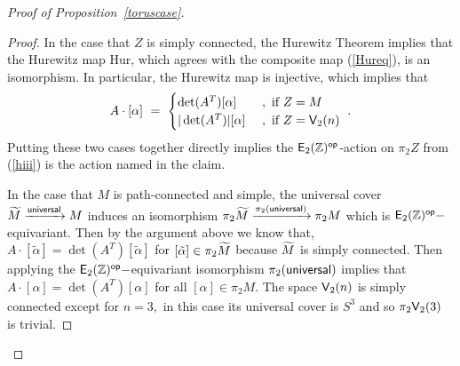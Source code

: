 \begin{proof}[Proof of Proposition~\ref{toruscase}]
\begin{proof}


In the case that $Z$ is simply connected, the Hurewitz Theorem implies that the Hurewitz map {\sf Hur}, which agrees with the composite map (\ref{Hureq}), is an isomorphism.
In particular, the Hurewitz map is injective, which implies that 
\[
A \cdot [\alpha]
~=~ 
\begin{cases}
\det(A^T)[\alpha]
&
~,
\text{ if }Z=M
\\
| \det(A^T)| [\alpha] 
&
~,
\text{ if }Z=\mathsf V_2(n)
\end{cases}
~.
\]
Putting these two cases together directly implies the ${\sf E}_2(\mathbb Z)^{\operatorname{\mathsf{op}}}$-action on $\pi_{2}Z$ from (\ref{hiii}) is the action named in the claim.  


In the case that $M$ is path-connected and simple, the universal cover $\widetilde{M} \xrightarrow{\sf universal} M$ induces an isomorphism $\pi_{2}\widetilde{M} \xrightarrow{\pi_{2}(\sf universal)} \pi_{2}M$ which is $\mathsf E_2(\mathbb Z)^{\operatorname{\mathsf{op}}}-$equivariant. Then by the argument above we know that, $A \cdot [\tilde{\alpha}] = \det(A^{T})[\tilde{\alpha}]$ for $[\tilde{\alpha}] \in \pi_{2}\widetilde{M}$ because $\widetilde{M}$ is simply connected. Then applying the $\mathsf E_2(\mathbb Z)^{\operatorname{\mathsf{op}}}-$equivariant isomorphism $\pi_{2}(\sf universal)$ implies that $A \cdot [\alpha] = \det(A^{T})[\alpha]$ for all $[\alpha] \in \pi_{2}M.$ The space $\mathsf V_{2}(n)$ is simply connected except for $n = 3,$ in this case its universal cover is $S^{3}$ and so $\pi_{2}\mathsf V_{2}(3)$ is trivial.

\end{proof}




\end{proof}




